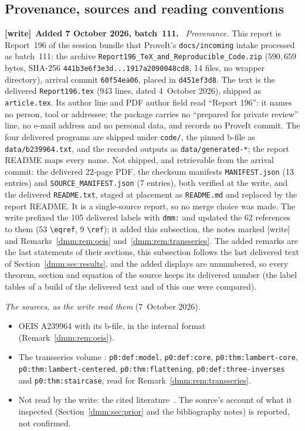 \documentclass[11pt,letterpaper]{article}
\numberwithin{equation}{section}
\theoremstyle{definition}\newtheorem{definition}[theorem]{Definition}
\theoremstyle{remark}\newtheorem{remark}[theorem]{Remark}
\newcommand{\file}[1]{\nolinkurl{#1}}
\newenvironment{writenote}[1][]{\par\smallskip\begingroup\small
 \noindent\textbf{[write]}\if\relax\detokenize{#1}\relax\else~\textbf{#1.}\fi\ }%
 {\par\endgroup\smallskip}
\begin{document}
\subsection{Provenance, sources and reading conventions}\label{dmm:sec:provenance}
\begin{writenote}[Added 7 October 2026, batch~111]
\emph{Provenance.} This report is Report~196 of the session bundle that
ProveIt's \file{docs/incoming} intake processed as batch~111: the archive
\file{Report196_TeX_and_Reproducible_Code.zip} ($590{,}659$ bytes, SHA-256
\file{441b3e6f3e3d...1917a2090048cd8}, 14 files, no wrapper directory), arrival
commit \file{60f54ea06}, placed in \file{d451ef3d8}. The text is the
delivered \file{Report196.tex} (943 lines, dated 4~October 2026), shipped as
\file{article.tex}. Its author line and PDF author field read ``Report 196'':
it names no person, tool or addressee; the package carries no ``prepared for
private review'' line, no e-mail address and no personal data, and records
no ProveIt commit. The four delivered programs are shipped under
\file{code/}, the pinned b-file as \file{data/b239964.txt}, and the recorded
outputs as \file{data/generated-*}; the report README maps every name. Not
shipped, and retrievable from the arrival commit: the delivered 22-page PDF,
the checksum manifests \file{MANIFEST.json} (13 entries) and
\file{SOURCE_MANIFEST.json} (7 entries), both verified at the write, and the
delivered \file{README.txt}, staged at placement as \file{README.md} and
replaced by the report README. It is a single-source report, so no merge
choice was made. The write prefixed the 105 delivered labels with
\file{dmm:} and updated the 62 references to them (53 \verb|\eqref|,
9 \verb|\ref|); it added this subsection, the notes marked [write] and
Remarks~\ref{dmm:rem:oeis} and~\ref{dmm:rem:transseries}. The added remarks
are the last statements of their sections, this subsection follows the last
delivered text of Section~\ref{dmm:sec:results}, and the added displays are
unnumbered, so every theorem, section and equation of the source keeps its
delivered number (the label tables of a build of the delivered text and of
this one were compared).

\emph{The sources, as the write read them} (7~October 2026).
\begin{itemize}[leftmargin=*]\raggedright
\item OEIS A239964 with its b-file, in the internal format
 (Remark~\ref{dmm:rem:oeis}).
\item The transseries volume
 :
 \file{p0:def:model}, \file{p0:def:core}, \file{p0:thm:lambert-core},
 \file{p0:thm:lambert-centered}, \file{p0:thm:flattening},
 \file{p0:def:three-inverses} and \file{p0:thm:staircase}, read for
 Remark~\ref{dmm:rem:transseries}.
\item Not read by the write: the cited
 literature~\cite{mutafchiev,goh,hwang,rala,grabner}. The source's account
 of what it inspected (Section~\ref{dmm:sec:prior} and the bibliography
 notes) is reported, not confirmed.
\end{itemize}


\end{writenote}
\end{document}
